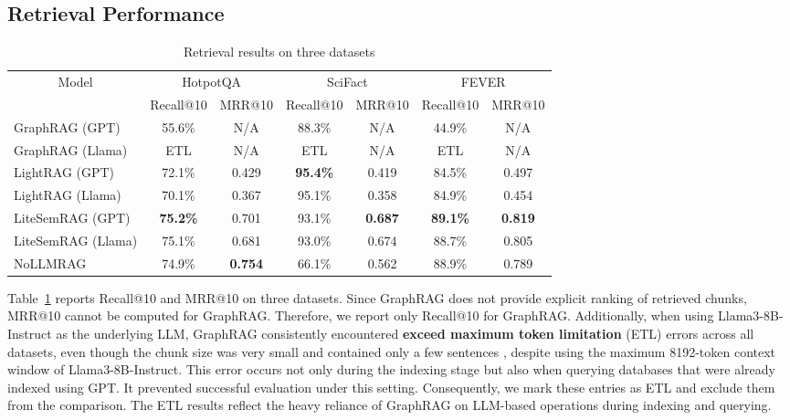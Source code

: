 \documentclass[conference]{IEEEtran}
\begin{document}
\subsection{Retrieval Performance}
\begin{table}[t]
\centering
\small
\setlength{\tabcolsep}{5pt}
\caption{Retrieval results on three datasets}
\label{retrieval results}
\begin{tabular}{lcccccc}
\hline
\multicolumn{1}{c}{\multirow{2}{*}{Model}} & \multicolumn{2}{c}{HotpotQA}     & \multicolumn{2}{c}{SciFact}      & \multicolumn{2}{c}{FEVER}        \\ \cline{2-7}
\multicolumn{1}{c}{}                       & Recall@10       & MRR@10         & Recall@10       & MRR@10         & Recall@10       & MRR@10         \\ \hline
GraphRAG (GPT)                             & 55.6\%          & N/A            & 88.3\%          & N/A            & 44.9\%          & N/A            \\
GraphRAG (Llama)                           & ETL             & N/A            & ETL             & N/A            & ETL             & N/A            \\
LightRAG (GPT)                             & 72.1\%          & 0.429          & \textbf{95.4\%} & 0.419          & 84.5\%          & 0.497          \\
LightRAG (Llama)                           & 70.1\%          & 0.367          & 95.1\%          & 0.358          & 84.9\%          & 0.454          \\
LiteSemRAG (GPT)                           & \textbf{75.2\%} & 0.701          & 93.1\%          & \textbf{0.687} & \textbf{89.1\%} & \textbf{0.819} \\
LiteSemRAG (Llama)                         & 75.1\%          & 0.681          & 93.0\%          & 0.674          & 88.7\%          & 0.805          \\
NoLLMRAG                                   & 74.9\%          & \textbf{0.754} & 66.1\%          & 0.562          & 88.9\%          & 0.789          \\ \hline
\end{tabular}
\end{table}
 Table~\ref{retrieval results} reports Recall@10 and MRR@10 on three datasets. Since GraphRAG does not provide explicit ranking of retrieved chunks, MRR@10 cannot be computed for GraphRAG. Therefore, we report only Recall@10 for GraphRAG. Additionally, when using Llama3-8B-Instruct as the underlying LLM, GraphRAG consistently encountered \textbf{exceed maximum token limitation} (ETL) errors across all datasets, even though the chunk size was very small and contained only a few sentences , despite using the maximum 8192-token context window of Llama3-8B-Instruct. This error occurs not only during the indexing stage but also when querying databases that were already indexed using GPT. It prevented successful evaluation under this setting. Consequently, we mark these entries as ETL and exclude them from the comparison. The ETL results reflect the heavy reliance of GraphRAG on LLM-based operations during indexing and querying.
\end{document}
